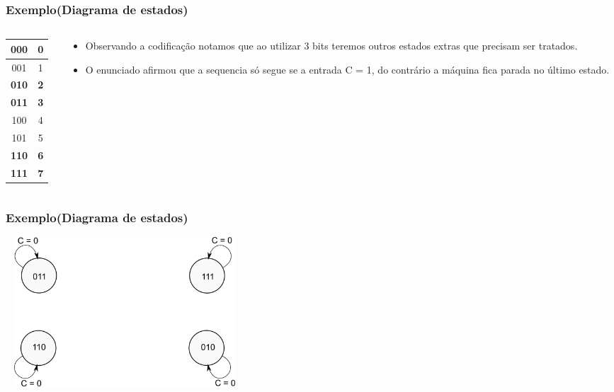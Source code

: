 \documentclass{beamer}
\begin{document}
\begin{frame}
 \frametitle{Exemplo(Diagrama de estados)}
 \begin{columns}[c]

  \begin{column}{1cm}
   \begin{tabular}{|c|c|}
    \hline
    000 & 0 \\
    \hline
    001 & 1 \\
    \hline
    \textbf{010} & \textbf{2} \\
    \hline
    \textbf{011} & \textbf{3} \\
    \hline
    100 & 4 \\
    \hline
    101 & 5 \\
    \hline
    \textbf{110} & \textbf{6} \\
    \hline
    \textbf{111} & \textbf{7} \\
    \hline
   \end{tabular}
  \end{column} 

  \begin{column}{8cm}
    \begin{itemize}
    \item Observando a codificação notamos que ao utilizar 3 bits teremos outros estados extras que precisam ser tratados.\pause
    \item O enunciado afirmou que a sequencia só segue se a entrada C = 1, do contrário a máquina fica parada no último estado.
    \end{itemize}
  \end{column} 
 \end{columns}
\end{frame}

\begin{frame}
  \frametitle{Exemplo(Diagrama de estados)}
  \begin{center}
    \includegraphics[height = 2.2in, width = 3.5in]{exemplo_projeto_1.png}
  \end{center}
\end{frame}
\end{document}
